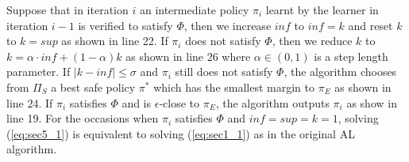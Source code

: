 Suppose that in iteration $i$ an intermediate policy $\pi_i$ learnt by the learner in iteration $i-1$ is verified to satisfy $\Phi$, then we increase $inf$ to $inf=k$ and reset $k$ to $k=sup$ as shown in line 22. 
If $\pi_i$ does not satisfy $\Phi$, then we reduce $k$ to $k=\alpha\cdot inf + (1 - \alpha)k$  as shown in line 26 where $\alpha\in(0, 1)$ is a step length parameter. 
If $|k-inf|\leq\sigma$ and $\pi_i$ still does not satisfy $\Phi$, the algorithm chooses from $\Pi_S$ a best safe policy $\pi^*$ which has the smallest margin to $\pi_E$ as shown in line 24. If $\pi_i$ satisfies $\Phi$ and is {$\epsilon$-close} to $\pi_E$, the algorithm outputs $\pi_i$ as show in line 19. For the occasions when $\pi_i$ satisfies $\Phi$ and $inf = sup = k = 1$, solving (\ref{eq:sec5_1}) is equivalent to solving (\ref{eq:sec1_1}) as in the original AL algorithm.
